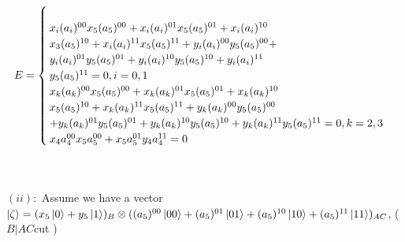 \documentclass[a4paper,12pt]{article}
\begin{document}
\begin{equation}
E=\begin{cases}
\newline \\
x_{i}(a_{i})^{00}x_{5}(a_{5})^{00}+x_{i}(a_{i})^{01}x_{5}(a_{5})^{01}+x_{i}(a_{i})^{10}\\
x_{3}(a_{5})^{10}+x_{i}(a_{i})^{11}x_{5}(a_{5})^{11}+y_{i}(a_{i})^{00}y_{5}(a_{5})^{00}+\\
y_{i}(a_{i})^{01}y_{5}(a_{5})^{01}+y_{i}(a_{i})^{10}y_{5}(a_{5})^{10}+y_{i}(a_{i})^{11}\\
y_{5}(a_{5})^{11}=0  
,    i=0,1
\newline \\
x_{k}(a_{k})^{00}x_{5}(a_{5})^{00}+x_{k}(a_{k})^{01}x_{5}(a_{5})^{01}+x_{k}(a_{k})^{10}\\
x_{5}(a_{5})^{10}+x_{k}(a_{k})^{11}x_{5}(a_{5})^{11}+y_{k}(a_{k})^{00}y_{5}(a_{5})^{00}\\+
y_{k}(a_{k})^{01}y_{5}(a_{5})^{01}+y_{k}(a_{k})^{10}y_{5}(a_{5})^{10}+y_{k}(a_{k})^{11}
y_{5}(a_{5})^{11}=0 
, k=2,3
\newline\\
x_{4}a_{4}^{00}x_{5}a_{5}^{00}+x_{5}a_{5}^{01}y_{4}a_{4}^{11}=0
\end{cases}	
\end{equation}








\leavevmode\\
\newline \\
$(ii)    :$ Assume we have a vector $\ket{\zeta}=(x_{5}\ket{0}+y_{5}\ket{1})_{B}\otimes ((a_{5})^{00}\ket{00}+(a_{5})^{01}\ket{01}+(a_{5})^{10}\ket{10}+(a_{5})^{11}\ket{11})_{AC}$,   ( $      B|AC    $cut   )
\leavevmode
\newline \\
\end{document}
